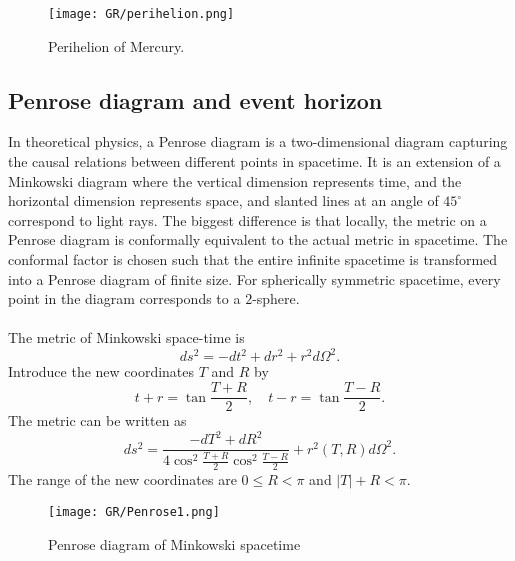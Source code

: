 \begin{figure}[!htb]
\centering
\texttt{[image: GR/perihelion.png]}
\caption{Perihelion of Mercury.}
\end{figure}

\subsection{Penrose diagram and event horizon}
In theoretical physics, a Penrose diagram is a two-dimensional diagram capturing the causal relations between different points in spacetime. 
It is an extension of a Minkowski diagram where the vertical dimension represents time, and the horizontal dimension represents space, and slanted lines at an angle of $45^{\circ}$ correspond to light rays. 
The biggest difference is that locally, the metric on a Penrose diagram is conformally equivalent to the actual metric in spacetime. 
The conformal factor is chosen such that the entire infinite spacetime is transformed into a Penrose diagram of finite size. 
For spherically symmetric spacetime, every point in the diagram corresponds to a $2$-sphere.
\\ \\
The metric of Minkowski space-time is 
\[ds^2 = -dt^2 + dr^2 + r^2 d\Omega^2.\]
Introduce the new coordinates $T$ and $R$ by 
\[t + r = \tan \frac{T+R}{2} ,\quad t - r = \tan \frac{T-R}{2}.\]
The metric can be written as
\[ds^2 = \frac{-dT^2+dR^2}{4\cos^2\frac{T+R}{2} \cos^2 \frac{T-R}{2}} + r^2(T,R) d\Omega^2.\]
The range of the new coordinates are $0 \leq R < \pi$ and  $|T| + R < \pi$.

\begin{figure}[!htb]
\centering
\texttt{[image: GR/Penrose1.png]}
\caption{Penrose diagram of Minkowski spacetime}
\end{figure}

